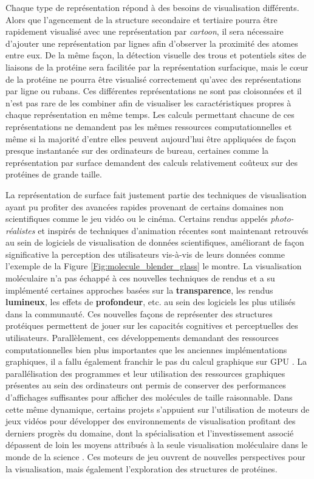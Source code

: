Chaque type de représentation répond à des besoins de visualisation différents. Alors que l'agencement de la structure secondaire et tertiaire pourra être rapidement visualisé avec une représentation par \textit{cartoon}, il sera nécessaire d'ajouter une représentation par lignes afin d'observer la proximité des atomes entre eux. De la même façon, la détection visuelle des trous et potentiels sites de liaisons de la protéine sera facilitée par la représentation surfacique, mais le cœur de la protéine ne pourra être visualisé correctement qu'avec des représentations par ligne ou rubans. Ces différentes représentations ne sont pas cloisonnées et il n'est pas rare de les combiner afin de visualiser les caractéristiques propres à chaque représentation en même temps. Les calculs permettant chacune de ces représentations ne demandent pas les mêmes ressources computationnelles et même si la majorité d'entre elles peuvent aujourd'hui être appliquées de façon presque instantanée sur des ordinateurs de bureau, certaines comme la représentation par surface demandent des calculs relativement coûteux sur des protéines de grande taille.

La représentation de surface fait justement partie des techniques de visualisation ayant pu profiter des avancées rapides provenant de certains domaines non scientifiques comme le jeu vidéo ou le cinéma. Certains rendus appelés \textit{photo-réalistes} et inspirés de techniques d'animation récentes sont maintenant retrouvés au sein de logiciels de visualisation de données scientifiques, améliorant de façon significative la perception des utilisateurs vis-à-vis de leurs données comme l'exemple de la Figure \ref{Fig:molecule_blender_glass} le montre. La visualisation moléculaire n'a pas échappé à ces nouvelles techniques de rendus et a su implémenté certaines approches basées sur la \textbf{transparence}, les rendus \textbf{lumineux}, les effets de \textbf{profondeur}, etc. au sein des logiciels les plus utilisés dans la communauté. Ces nouvelles façons de représenter des structures protéiques permettent de jouer sur les capacités cognitives et perceptuelles des utilisateurs. Parallèlement, ces développements demandant des ressources computationnelles bien plus importantes que les anciennes implémentations graphiques, il a fallu également franchir le pas du calcul graphique sur GPU \cite{chavent_gpu-powered_2011}. La parallélisation des programmes et leur utilisation des ressources graphiques présentes au sein des ordinateurs ont permis de conserver des performances d'affichages suffisantes pour afficher des molécules de taille raisonnable. Dans cette même dynamique, certains projets s'appuient sur l'utilisation de moteurs de jeux vidéos pour développer des environnements de visualisation profitant des derniers progrès du domaine, dont la spécialisation et l'investissement associé dépassent de loin les moyens attribués à la seule visualisation moléculaire dans le monde de la science \cite{andrei2012intuitive,lv_game_2013}. Ces moteurs de jeu ouvrent de nouvelles perspectives pour la visualisation, mais également l'exploration des structures de protéines.

